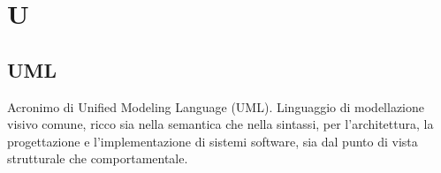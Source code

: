 \section{U}

\subsection{UML}%
Acronimo di Unified Modeling Language (UML).
Linguaggio di modellazione visivo comune, ricco sia nella semantica che nella sintassi, 
per l'architettura, la progettazione e l'implementazione di sistemi software, sia dal punto di vista strutturale che comportamentale.

\clearpage